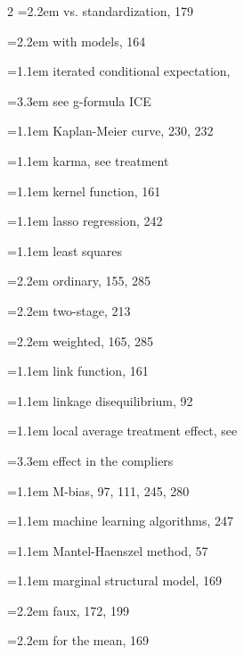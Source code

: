 \begin{multicols}{2}
\hspace*{1.1em}\hangindent=2.2em vs. standardization, 179\par
\hspace*{1.1em}\hangindent=2.2em with models, 164\par
\hangindent=1.1em iterated conditional expectation,\par
\hspace*{2.2em}\hangindent=3.3em see g-formula ICE\par
\hangindent=1.1em Kaplan-Meier curve, 230, 232\par
\hangindent=1.1em karma, see treatment\par
\hangindent=1.1em kernel function, 161\par
\hangindent=1.1em lasso regression, 242\par
\hangindent=1.1em least squares\par
\hspace*{1.1em}\hangindent=2.2em ordinary, 155, 285\par
\hspace*{1.1em}\hangindent=2.2em two-stage, 213\par
\hspace*{1.1em}\hangindent=2.2em weighted, 165, 285\par
\hangindent=1.1em link function, 161\par
\hangindent=1.1em linkage disequilibrium, 92\par
\hangindent=1.1em local average treatment effect, see\par
\hspace*{2.2em}\hangindent=3.3em effect in the compliers\par
\hangindent=1.1em M-bias, 97, 111, 245, 280\par
\hangindent=1.1em machine learning algorithms, 247\par
\hangindent=1.1em Mantel-Haenszel method, 57\par
\hangindent=1.1em marginal structural model, 169\par
\hspace*{1.1em}\hangindent=2.2em faux, 172, 199\par
\hspace*{1.1em}\hangindent=2.2em for the mean, 169\par

\end{multicols}
